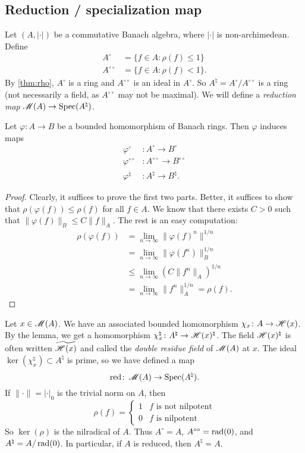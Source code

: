 \subsection{Reduction / specialization map}

Let $(A,|\cdot|)$ be a commutative Banach algebra, where $|\cdot|$ is 
non-archimedean. Define 
\begin{align*}
	A^\circ &= \{f\in A\colon \rho(f)\leqslant 1\} \\
	A^{\circ\circ} &= \{f\in A\colon \rho(f)<1\} .
\end{align*}
By \autoref{thm:rho}, $A^\circ$ is a ring and $A^{\circ\circ}$ is an ideal in 
$A^\circ$. So $A^\natural=A^\circ/A^{\circ\circ}$ is a ring (not necessarily a 
field, as $A^{\circ\circ}$ may not be maximal). We will define a \emph{reduction 
map} $\operatorname{\mathscr{M}}(A)\to \operatorname{Spec}(A^\natural)$. 

\begin{lemma}
Let $\varphi\colon A\to B$ be a bounded homomorphism of Banach rings. Then 
$\varphi$ induces maps 
\begin{align*}
	\varphi^\circ &\colon A^\circ\to B^\circ \\
	\varphi^{\circ\circ} &\colon A^{\circ\circ}\to B^{\circ\circ} \\ 
	\varphi^\natural &\colon A^\natural \to B^\natural .
\end{align*}
\end{lemma}
\begin{proof}
Clearly, it suffices to prove the first two parts. Better, it suffices to 
show that $\rho(\varphi(f))\leqslant \rho(f)$ for all $f\in A$. We know that 
there exists $C>0$ such that $\|\varphi(f)\|_B\leqslant C \|f\|_A$. The rest 
is an easy computation:
\begin{align*}
	\rho(\varphi(f)) 
		&= \lim_{n\to \infty} \|\varphi(f)^n\|^{1/n} \\
		&= \lim_{n\to \infty} \| \varphi(f^n)\|_B^{1/n} \\
		&\leqslant \lim_{n\to \infty} \left(C \|f^n\|_A\right)^{1/n} \\
		&= \lim_{n\to \infty} \|f^n\|^{1/n}_A = \rho(f) .
\end{align*}
\end{proof}

Let $x\in \operatorname{\mathscr{M}}(A)$. We have an associated bounded homomorphism 
$\chi_x\colon A\to \mathscr{H}(x)$. By the lemma, we get a homomorphism 
$\chi_x^\natural\colon A^\natural\to \mathscr{H}(x)^\natural$. The field 
$\mathscr{H}(x)^\natural$ is often written $\widetilde{\mathscr{H}(x)}$ and called the 
\emph{double residue field} of $\operatorname{\mathscr{M}}(A)$ at $x$. The ideal 
$\ker(\chi_x^\natural)\subset A^\natural$ is prime, so we have defined a map 
\[
	\operatorname{red}\colon \operatorname{\mathscr{M}}(A)\to \operatorname{Spec}(A^\natural) .
\]
If $\|\cdot\|=|\cdot|_0$ is the trivial norm on $A$, then 
\[
	\rho(f) = \begin{cases} 1 & f\text{ is not nilpotent} \\ 0 & f\text{ is nilpotent} \end{cases} 
\]
So $\ker(\rho)$ is the nilradical of $A$. Thus $A^\circ=A$, 
$A^{\circ\circ}=\operatorname{rad}(0)$, and $A^\natural=A/\operatorname{rad}(0)$. In particular, if $A$ is 
reduced, then $A^\natural=A$. 

